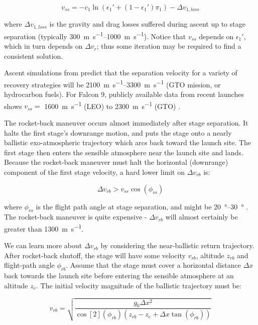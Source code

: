 \documentclass[conf]{new-aiaa}
\begin{document}
\begin{equation}
v_{ss} = - c_1 \ln\left( \epsilon_1' + (1 - \epsilon_1') \pi_1 \right) - \Delta v_{1,loss}
\end{equation}

where $\Delta v_{1,loss}$ is the gravity and drag losses suffered during ascent up to stage separation (typically \SIrange{300}{1000}{\meter\per\second}). Notice that $v_{ss}$ depends on $\epsilon_1'$, which in turn depends on $\Delta v_r$; thus some iteration may be required to find a consistent solution.

Ascent simulations from \cite{Stappert2017} predict that the separation velocity for a variety of recovery strategies will be \SIrange{2100}{3300}{\meter\per\second} (GTO mission,  or hydrocarbon fuels). For Falcon 9, publicly available data from recent launches shows $v_{ss} =$ \SI{1600}{\meter\per\second} (LEO) to \SI{2300}{\meter\per\second} (GTO) \cite{SpaceXWebcast}.

The rocket-back maneuver occurs almost immediately after stage separation. It halts the first stage's downrange motion, and puts the stage onto a nearly ballistic exo-atmospheric trajectory which arcs back toward the launch site. The first stage then enters the sensible atmosphere near the launch site and lands. Because the rocket-back maneuver must halt the horizontal (downrange) component of the first stage velocity, a hard lower limit on $\Delta v_{rb}$ is:

\begin{equation}
\Delta v_{rb} > v_{ss} \cos(\phi_{ss})
\end{equation}

where $\phi_{ss}$ is the flight path angle at stage separation, and might be \SIrange{20}{30}{\degree} \cite{McKinney1986}. The rocket-back maneuver is quite expensive - $\Delta v_{rb}$ will almost certainly be greater than \SI{1300}{\meter\per\second}.

We can learn more about $\Delta v_{rb}$ by considering the near-ballistic return trajectory. After rocket-back shutoff, the stage will have some velocity $v_{rb}$, altitude $z_{rb}$ and flight-path angle $\phi_{rb}$. Assume that the stage must cover a horizontal distance $\Delta x$ back towards the launch site before entering the sensible atmosphere at an altitude $z_e$. The initial velocity magnitude of the ballistic trajectory must be:

\begin{equation}
\label{eq:rocketback_velocity}
v_{rb} = \sqrt{\frac{g_0 \Delta x^2}{\cos[2](\phi_{rb})(z_{rb} - z_{e} + \Delta x \tan(\phi_{rb}))} }
\end{equation}
\end{document}
